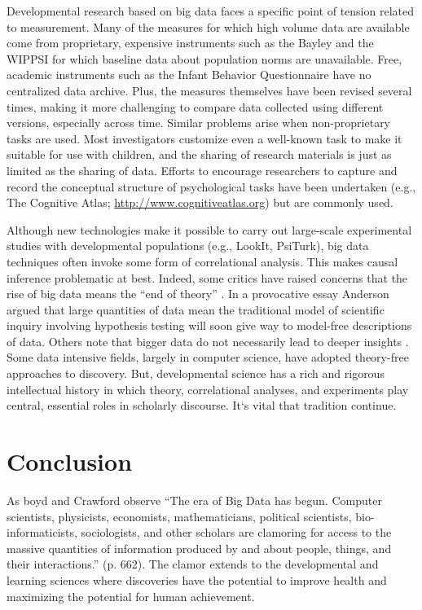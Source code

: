 \documentclass[letterpaper,man,apacite,natbib]{apa6}
\begin{document}
Developmental research based on big data faces a specific point of tension related to measurement.
Many of the measures for which high volume data are available come from proprietary, expensive instruments such as the Bayley and the WIPPSI for which baseline data about population norms are unavailable.
Free, academic instruments such as the Infant Behavior Questionnaire have no centralized data archive.
Plus, the measures themselves have been revised several times, making it more challenging to compare data collected using different versions, especially across time.
Similar problems arise when non-proprietary tasks are used.
Most investigators customize even a well-known task to make it suitable for use with children, and the sharing of research materials is just as limited as the sharing of data.
Efforts to encourage researchers to capture and record the conceptual structure of psychological tasks have been undertaken (e.g., The Cognitive Atlas; \url{http://www.cognitiveatlas.org}) but are commonly used.

Although new technologies make it possible to carry out large-scale experimental studies with developmental populations (e.g., LookIt, PsiTurk), big data techniques often invoke some form of correlational analysis.
This makes causal inference problematic at best.
Indeed, some critics have raised concerns that the rise of big data means the ``end of theory'' \cite{anderson_end_2008}.
In a provocative essay Anderson \citeyear{anderson_end_2008} argued that large quantities of data mean the traditional model of scientific inquiry involving hypothesis testing will soon give way to model-free descriptions of data.
Others note that bigger data do not necessarily lead to deeper insights \cite{graham_big_2012}.
Some data intensive fields, largely in computer science, have adopted theory-free approaches to discovery.
But, developmental science has a rich and rigorous intellectual history in which theory, correlational analyses, and experiments play central, essential roles in scholarly discourse.
It`s vital that tradition continue.
\section{Conclusion}
As boyd and Crawford \citeyear{boyd_critical_2012} observe ``The era of Big Data has begun. Computer scientists, physicists, economists, mathematicians, political scientists, bio-informaticists, sociologists, and other scholars are clamoring for access to the massive quantities of information produced by and about people, things, and their interactions.'' (p. 662).
The clamor extends to the developmental and learning sciences where discoveries have the potential to improve health and maximizing the potential for human achievement.
\end{document}

